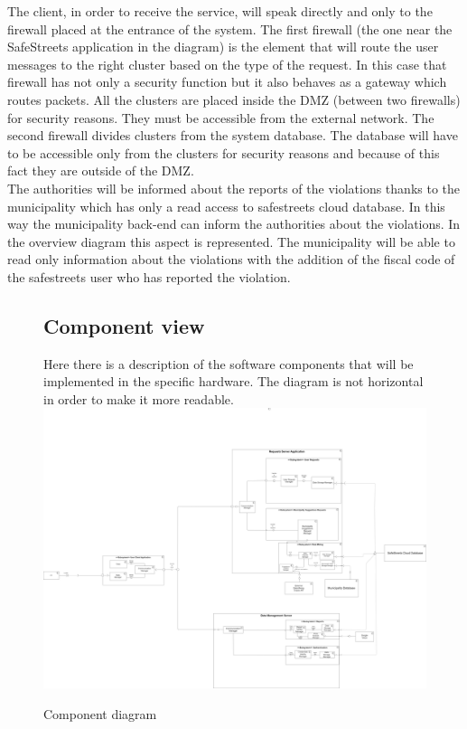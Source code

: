 \documentclass[titlepage]{article}
\begin{document}
The client, in order to receive the service, will speak directly and only to the firewall placed at the entrance of the system. The first firewall (the one near the SafeStreets application in the diagram) is the element that will route the user messages to the right cluster based on the type of the request. In this case that firewall has not only a security function but it also behaves as a gateway which routes packets. All the clusters are placed inside the DMZ (between two firewalls) for security reasons. They must be accessible from the external network. The second firewall divides clusters from the system database. The database will have to be accessible only from the clusters for security reasons and because of this fact they are outside of the DMZ. \\
The authorities will be informed about the reports of the violations thanks to the municipality which has only a read access to safestreets cloud database. In this way the municipality back-end can inform the authorities about the violations. In the overview diagram this aspect is represented. The municipality will be able to read only information about the violations with the addition of the fiscal code of the safestreets user who has reported the violation.

\begin{figure}[h]
\subsection{Component view}
Here there is a description of the software components that will be implemented in the specific hardware. The diagram is not horizontal in order to make it more readable. 
\\
	\includegraphics[scale=0.133, angle=-90]{Diagrams/Component diagram.png}
	\caption{Component diagram}
\end{figure}
\FloatBarrier
\end{document}

